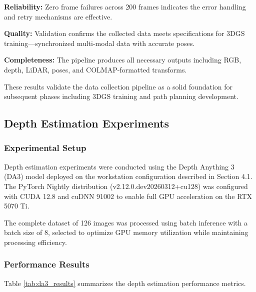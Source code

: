 \textbf{Reliability:} Zero frame failures across 200 frames indicates the error handling and retry mechanisms are effective.

\textbf{Quality:} Validation confirms the collected data meets specifications for 3DGS training---synchronized multi-modal data with accurate poses.

\textbf{Completeness:} The pipeline produces all necessary outputs including RGB, depth, LiDAR, poses, and COLMAP-formatted transforms.

These results validate the data collection pipeline as a solid foundation for subsequent phases including 3DGS training and path planning development.

\subsection{Depth Estimation Experiments}

\subsubsection{Experimental Setup}

Depth estimation experiments were conducted using the Depth Anything 3 (DA3) model deployed on the workstation configuration described in Section 4.1. The PyTorch Nightly distribution (v2.12.0.dev20260312+cu128) was configured with CUDA 12.8 and cuDNN 91002 to enable full GPU acceleration on the RTX 5070 Ti.

The complete dataset of 126 images was processed using batch inference with a batch size of 8, selected to optimize GPU memory utilization while maintaining processing efficiency.

\subsubsection{Performance Results}

Table \ref{tab:da3_results} summarizes the depth estimation performance metrics.

